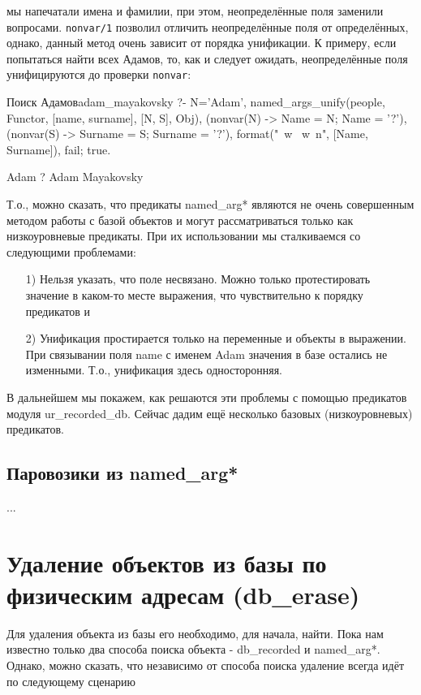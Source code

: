 \documentclass[a4paper]{book}
\def\na{named\_arg*}
\begin{document}
мы напечатали имена и фамилии, при этом, неопределённые поля
заменили вопросами. \verb|nonvar/1| позволил отличить
неопределённые поля от определённых, однако, данный метод очень
зависит от порядка унификации. К примеру, если попытаться найти
всех Адамов, то, как и следует ожидать, неопределённые поля
унифицируются до проверки \verb|nonvar|:

\begin{example}{Поиск Адамов}{adam_mayakovsky}
?- N='Adam', 
   named_args_unify(people, Functor, [name, surname], 
                    [N, S], Obj), 
   (nonvar(N) -> Name = N; Name = '?'), 
   (nonvar(S) -> Surname = S; Surname = '?'), 
   format("~w ~w~n", [Name, Surname]), fail; true.
                                                              
Adam ?
Adam Mayakovsky
\end{example}

Т.о., можно сказать, что предикаты named\_arg* являются
не очень совершенным методом работы с базой объектов и могут
рассматриваться только как низкоуровневые предикаты. При их
использовании мы сталкиваемся со следующими проблемами:

\begin{itemize}
\item[1)] Нельзя указать, что поле несвязано. Можно только
  протестировать значение в каком-то месте выражения, что
  чувствительно к порядку предикатов и
\item[2)] Унификация простирается только на переменные и объекты в
  выражении. При связывании поля name с именем Adam значения в
  базе остались не изменными. Т.о., унификация здесь
  односторонняя.
\end{itemize}

В дальнейшем мы покажем, как решаются эти проблемы с помощью
предикатов модуля ur\_recorded\_db. Сейчас дадим ещё несколько
базовых (низкоуровневых) предикатов.

\subsection{Паровозики из \na}

...

\section{Удаление объектов из базы по физическим адресам
  (db\_erase)}
\label{db_erase}
\label{db_copy}

Для удаления объекта из базы его необходимо, для начала,
найти. Пока нам известно только два способа поиска объекта -
db\_recorded и named\_arg*. Однако, можно сказать, что независимо
от способа поиска удаление всегда идёт по следующему сценарию
\end{document}
